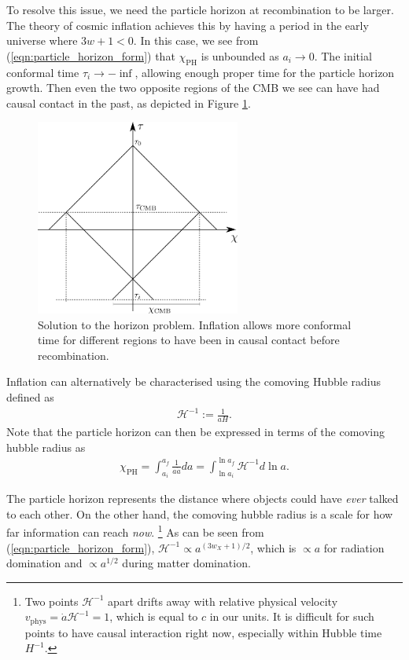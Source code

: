 To resolve this issue, we need the particle horizon at recombination to be larger. The theory of cosmic inflation achieves this by having a period in the early universe where $3w+1<0$. In this case, we see from (\ref{eqn:particle_horizon_form}) that $\chi_\text{PH}$ is unbounded as $a_i \rightarrow 0$. The initial conformal time $\tau_i \rightarrow -\inf$, allowing enough proper time for the particle horizon growth. Then even the two opposite regions of the CMB we see can have had causal contact in the past, as depicted in Figure \ref{fig:horizon_solution}.
\begin{figure}[htbp!] 
	\centering    
	\includegraphics[width=0.6\textwidth]{horizon_solution.png}
	\caption[Horizon problem]{Solution to the horizon problem. Inflation allows more conformal time for different regions to have been in causal contact before recombination.}
	\label{fig:horizon_solution}
\end{figure}

Inflation can alternatively be characterised using the comoving Hubble radius defined as
\begin{align}
	\mathcal{H}^{-1} := \frac{1}{aH}.
\end{align}
Note that the particle horizon can then be expressed in terms of the comoving hubble radius as
\begin{align}
	\chi_\text{PH} = \int_{a_i}^{a_f} \frac{1}{a \dot{a}} da = \int_{\ln a_i}^{\ln a_f} \mathcal{H}^{-1} d\ln a. \label{eqn:particle_horizon_comoving_hubble}
\end{align}

The particle horizon represents the distance where objects could have \textit{ever} talked to each other. On the other hand, the comoving hubble radius is a scale for how far information can reach \textit{now}. \footnote{Two points $\mathcal{H}^{-1}$ apart drifts away with relative physical velocity $v_\text{phys} = \dot{a} \mathcal{H}^{-1} = 1$, which is equal to $c$ in our units. It is difficult for such points to have causal interaction right now, especially within Hubble time $H^{-1}$.} As can be seen from (\ref{eqn:particle_horizon_form}), $\mathcal{H}^{-1} \propto a^{(3w_X+1)/2}$, which is $\propto a$ for radiation domination and $\propto a^{1/2}$ during matter domination.

